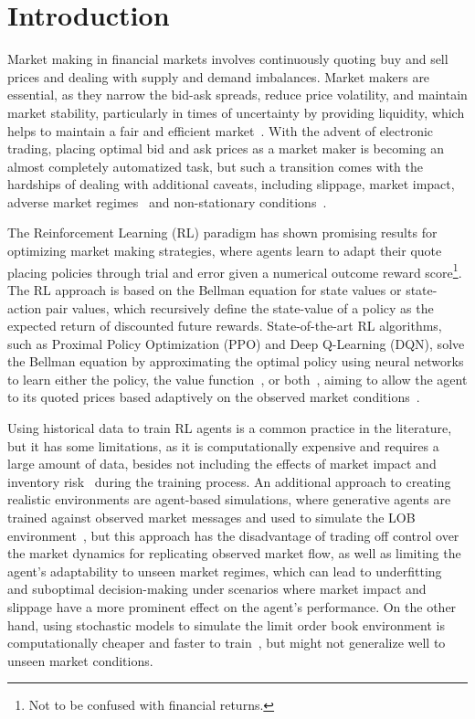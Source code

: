 \section{Introduction}
\label{sec:introduction}

Market making in financial markets involves continuously quoting buy and sell prices and dealing with supply and demand imbalances.
Market makers are essential, as they narrow the bid-ask spreads, reduce price volatility, and maintain market stability,
particularly in times of uncertainty by providing liquidity, which helps to maintain a fair and efficient market~\cite{Glosten1985, OHara1995}.
With the advent of electronic trading, placing optimal bid and ask prices as a market maker is becoming an almost completely automatized task,
but such a transition comes with the hardships of dealing with additional caveats, including slippage, market impact, adverse market regimes~\cite{Cont2010, Bouchaud2018}
and non-stationary conditions~\cite{Gasperov2021}.

The Reinforcement Learning (RL) paradigm has shown promising results for optimizing market making strategies,
where agents learn to adapt their quote placing policies through trial and error given a numerical outcome reward score\footnote{Not to be confused with financial returns.}.
The RL approach is based on the Bellman equation for state values or state-action pair values,
which recursively define the state-value of a policy as the expected return of discounted future rewards.
State-of-the-art RL algorithms, such as Proximal Policy Optimization (PPO) and Deep Q-Learning (DQN),
solve the Bellman equation by approximating the optimal policy using neural networks to learn either the policy, the value function~\cite{Sutton2018},
or both~\cite{Schulman2015, Mnih2015}, aiming to allow the agent to its quoted prices based adaptively on the observed market conditions~\cite{He2023, Bakshaev2020}.

Using historical data to train RL agents is a common practice in the literature, but it has some limitations,
as it is computationally expensive and requires a large amount of data,
besides not including the effects of market impact and inventory risk~\cite{Frey2023, Ganesh2019} during the training process.
An additional approach to creating realistic environments are agent-based simulations,
where generative agents are trained against observed market messages and used to simulate the LOB environment~\cite{Frey2023, Ganesh2019},
but this approach has the disadvantage of trading off control over the market dynamics for replicating observed market flow,
as well as limiting the agent's adaptability to unseen market regimes, which can lead to underfitting~\cite{Jerome2022, Selser2021}
and suboptimal decision-making under scenarios where market impact and slippage have a more prominent effect on the agent's performance.
On the other hand, using stochastic models to simulate the limit order book environment is computationally cheaper and faster to train~\cite{Gasperov2021, Sun2022},
but might not generalize well to unseen market conditions.

